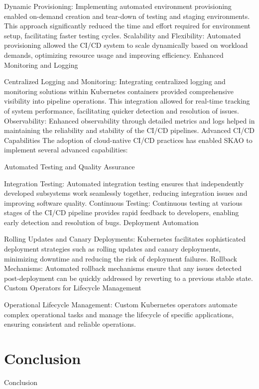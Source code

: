 \documentclass[a4paper]{spie}  %
\begin{document}
Dynamic Provisioning: Implementing automated environment provisioning enabled on-demand creation and tear-down of testing and staging environments. This approach significantly reduced the time and effort required for environment setup, facilitating faster testing cycles.
Scalability and Flexibility: Automated provisioning allowed the CI/CD system to scale dynamically based on workload demands, optimizing resource usage and improving efficiency.
Enhanced Monitoring and Logging

Centralized Logging and Monitoring: Integrating centralized logging and monitoring solutions within Kubernetes containers provided comprehensive visibility into pipeline operations. This integration allowed for real-time tracking of system performance, facilitating quicker detection and resolution of issues.
Observability: Enhanced observability through detailed metrics and logs helped in maintaining the reliability and stability of the CI/CD pipelines.
Advanced CI/CD Capabilities
The adoption of cloud-native CI/CD practices has enabled SKAO to implement several advanced capabilities:

Automated Testing and Quality Assurance

Integration Testing: Automated integration testing ensures that independently developed subsystems work seamlessly together, reducing integration issues and improving software quality.
Continuous Testing: Continuous testing at various stages of the CI/CD pipeline provides rapid feedback to developers, enabling early detection and resolution of bugs.
Deployment Automation

Rolling Updates and Canary Deployments: Kubernetes facilitates sophisticated deployment strategies such as rolling updates and canary deployments, minimizing downtime and reducing the risk of deployment failures.
Rollback Mechanisms: Automated rollback mechanisms ensure that any issues detected post-deployment can be quickly addressed by reverting to a previous stable state.
Custom Operators for Lifecycle Management

Operational Lifecycle Management: Custom Kubernetes operators automate complex operational tasks and manage the lifecycle of specific applications, ensuring consistent and reliable operations.


\section{Conclusion}

 Conclusion
\end{document}
